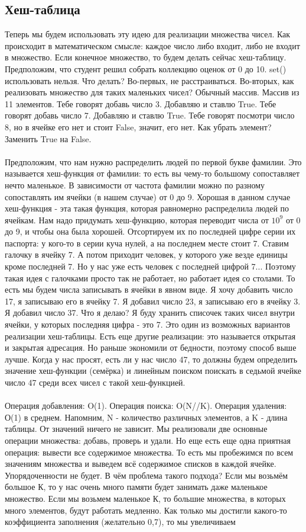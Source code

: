 \documentclass[a4paper,12pt]{article}
\begin{document}
\subsection{Хеш-таблица}
Теперь мы будем использовать эту идею для реализации множества чисел. Как происходит в математическом смысле: каждое число либо входит, либо не входит в множество. Если конечное множество, то будем делать сейчас хеш-таблицу. Предположим, что студент решил собрать коллекцию оценок от 0 до 10. set() использовать нельзя. Что делать? Во-первых, не расстраиваться. Во-вторых, как реализовать множество для таких маленьких чисел? Обычный массив. Массив из 11 элементов. Тебе говорят добавь число 3. Добавляю и ставлю True. Тебе говорят добавь число 7. Добавляю и ставлю True. Тебе говорят посмотри число 8, но в ячейке его нет и стоит False, значит, его нет. Как убрать элемент? Заменить True на False.\\ \\ Предположим, что нам нужно распределить людей по первой букве фамилии. Это называется хеш-функция от фамилии: то есть вы чему-то большому сопоставляет нечто маленькое. В зависимости от частота фамилии можно по разному сопоставлять им ячейки (в нашем случае) от 0 до 9. Хорошая в данном случае хеш-функция - эта такая функция, которая равномерно распределила людей по ячейкам. Нам надо придумать хеш-функцию, которая переводит числа от $10^9$ от 0 до 9, и чтобы она была хорошей. Отсортируем их по последней цифре серии их паспорта: у кого-то в серии куча нулей, а на последнем месте стоит 7. Ставим галочку в ячейку 7. А потом приходит человек, у которого уже везде единицы кроме последней 7. Но у нас уже есть человек с последней цифрой 7... Поэтому такая идея с галочками просто так не работает, но работает идея со столами. То есть мы будем числа записывать в ячейки в явном виде. Я хочу добавить число 17, я записываю его в ячейку 7. Я добавил число 23, я записываю его в ячейку 3. Я добавил число 37. Что я делаю? Я буду хранить списочек таких чисел внутри ячейки, у которых последняя цифра - это 7. Это один из возможных вариантов реализации хеш-таблицы. Есть еще другие реализации: это называется открытая и закрытая адресация. Но раньше экономили от бедности, поэтому способ выше лучше. Когда у нас просят, есть ли у нас число 47, то должны будем определить значение хеш-функции (семёрка) и линейным поиском поискать в седьмой ячейке число 47 среди всех чисел с такой хеш-функцией. \\ \\ Операция добавления: O(1). Операция поиска: O(N//K). Операция удаления: О(1) в среднем. Напомним, N - количество различных элементов, а K - длина таблицы. От значений ничего не зависит. Мы реализовали две основные операции множества: добавь, проверь и удали. Но еще есть еще одна приятная операция: вывести все содержимое множества. То есть мы пробежимся по всем значениям множества и выведем всё содержимое списков в каждой ячейке. Упорядоченности не будет. В чём проблема такого подхода? Если мы возьмём большое К, то у нас очень много памяти будет занимать даже маленькое множество. Если мы возьмем маленькое К, то большие множества, в которых много элементов, будут работать медленно. Как только мы достигли какого-то коэффициента заполнения (желательно 0,7), то мы увеличиваем 
\end{document}
